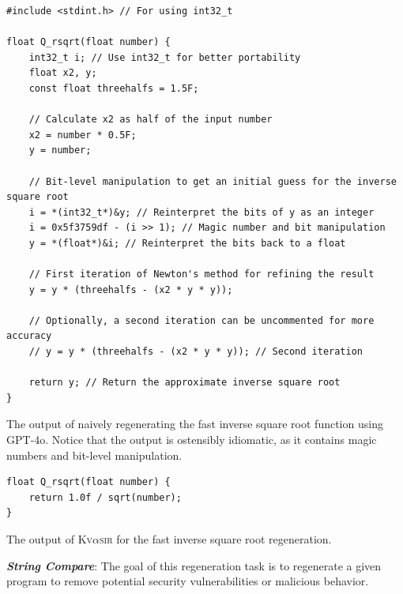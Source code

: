 \documentclass[nonacm,sigplan]{acmart}
\def\gptmodel{{GPT-4o}\xspace}
\newcommand{\sys}{{\scshape Kv{$\alpha$}sir}\xspace}
\newcommand{\heading}[1]{\vspace{2pt}\noindent\textbf{\emph{#1}}:\enspace}
\begin{document}
\begin{listing}[htpb]
\begin{verbatim}
#include <stdint.h> // For using int32_t

float Q_rsqrt(float number) {
    int32_t i; // Use int32_t for better portability
    float x2, y;
    const float threehalfs = 1.5F;

    // Calculate x2 as half of the input number
    x2 = number * 0.5F;
    y = number;

    // Bit-level manipulation to get an initial guess for the inverse square root
    i = *(int32_t*)&y; // Reinterpret the bits of y as an integer
    i = 0x5f3759df - (i >> 1); // Magic number and bit manipulation
    y = *(float*)&i; // Reinterpret the bits back to a float

    // First iteration of Newton's method for refining the result
    y = y * (threehalfs - (x2 * y * y));

    // Optionally, a second iteration can be uncommented for more accuracy
    // y = y * (threehalfs - (x2 * y * y)); // Second iteration

    return y; // Return the approximate inverse square root
}
\end{verbatim}
  \caption{The output of naively regenerating the fast inverse square root function using \gptmodel.
  Notice that the output is ostensibly idiomatic, as it contains magic numbers and bit-level manipulation.}
  \label{lst:fast_inv_sqrt_gpt}
\end{listing}

\begin{listing}[htpb]
\begin{verbatim}
float Q_rsqrt(float number) {
    return 1.0f / sqrt(number);
}
\end{verbatim}
\caption{The output of \sys for the fast inverse square root regeneration.}
  \label{lst:fast_inv_sqrt_sys}
\end{listing}


\heading{String Compare}
The goal of this regeneration task is to regenerate a given
program to remove potential security vulnerabilities or malicious behavior.
\end{document}
